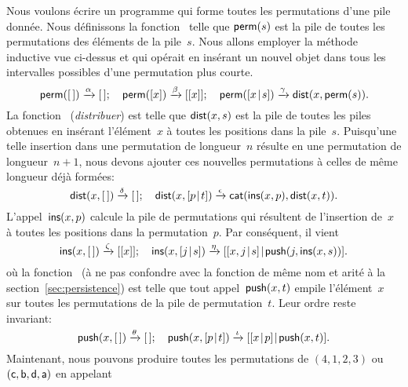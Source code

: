 Nous voulons écrire un programme qui forme toutes les permutations
d'une pile donnée. Nous définissons la
fonction~ telle que
\(\textsf{perm}(s)\) est la pile de toutes les permutations des éléments
de la pile~\(s\). Nous allons employer la méthode inductive vue
ci-dessus et qui opérait en insérant un nouvel objet dans tous les
intervalles possibles d'une permutation plus courte.
\begin{equation*}
\textsf{perm}([\,])         \xrightarrow{\smash{\alpha}} [\,];\quad
\textsf{perm}([x])         \xrightarrow{\smash{\beta}} [[x]];\quad
\textsf{perm}([{x}\!\mid\!{s}]) \xrightarrow{\gamma}
                          \textsf{dist}(x,\textsf{perm}(s)).
\end{equation*}
La fonction~ (\emph{distribuer})
est telle que \(\textsf{dist}(x,s)\) est la pile de toutes les piles
obtenues en insérant l'élément~\(x\) à toutes les positions dans la
pile~\(s\). Puisqu'une telle insertion dans une permutation de
longueur~\(n\) résulte en une permutation de longueur~\(n+1\), nous
devons ajouter ces nouvelles permutations à celles de même longueur
déjà formées:
\begin{equation*}
\textsf{dist}(x,[\,])         \xrightarrow{\smash{\delta}} [\,];\quad
\textsf{dist}(x,[{p}\!\mid\!{t}]) \xrightarrow{\smash{\epsilon}}
                            \textsf{cat}(\textsf{ins}(x,p),\textsf{dist}(x,t)).
\end{equation*}
L'appel~\(\textsf{ins}(x,p)\) calcule la pile de
permutations qui résultent de l'insertion de~\(x\) à toutes les
positions dans la permutation~\(p\). Par conséquent, il vient
\begin{equation*}
\textsf{ins}(x,[\,]) \xrightarrow{\smash{\zeta}} [[x]];\quad
\textsf{ins}(x,[{j}\!\mid\!{s}]) \xrightarrow{\smash{\eta}}
 [{[{x,j}\!\mid\!{s}]}\!\mid\!{\textsf{push}(j,\textsf{ins}(x,s))}].
\end{equation*}
où la fonction~ (à ne pas
confondre avec la fonction de même nom et arité à la
section~\ref{sec:persistence}) est telle que tout
appel~\(\textsf{push}(x,t)\) empile l'élément~\(x\) sur toutes les
permutations de la pile de permutation~\(t\). Leur ordre reste
invariant:
\begin{equation*}
\textsf{push}(x,[\,]) \xrightarrow{\smash{\theta}} [\,];\quad
\textsf{push}(x,[{p}\!\mid\!{t}]) \xrightarrow{\smash{\iota}}
 [{[{x}\!\mid\!{p}]}\!\mid\!{\textsf{push}(x,t)}].
\end{equation*}
Maintenant, nous pouvons produire toutes les permutations de
\((4,1,2,3)\) ou \((\textsf{c}, \textsf{b}, \textsf{d}, \textsf{a})\) en appelant
